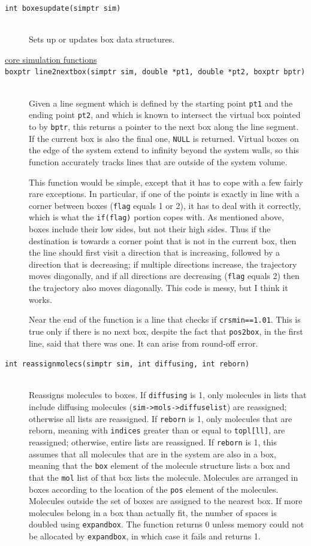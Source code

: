 \documentclass {scrbook}
\newcommand {\ttt} {\texttt}
\begin{document}
\begin{description}
\item[\ttt{int boxesupdate(simptr sim)}]
\hfill \\
Sets up or updates box data structures.

\item[\underline{core simulation functions}]

\item[\ttt{boxptr line2nextbox(simptr sim, double *pt1, double *pt2, boxptr bptr)}]
\hfill \\
Given a line segment which is defined by the starting point \ttt{pt1} and the ending point \ttt{pt2}, and which is known to intersect the virtual box pointed to by \ttt{bptr}, this returns a pointer to the next box along the line segment. If the current box is also the final one, \ttt{NULL} is returned. Virtual boxes on the edge of the system extend to infinity beyond the system walls, so this function accurately tracks lines that are outside of the system volume.

This function would be simple, except that it has to cope with a few fairly rare exceptions. In particular, if one of the points is exactly in line with a corner between boxes (\ttt{flag} equals 1 or 2), it has to deal with it correctly, which is what the \ttt{if(flag)} portion copes with. As mentioned above, boxes include their low sides, but not their high sides. Thus if the destination is towards a corner point that is not in the current box, then the line should first visit a direction that is increasing, followed by a direction that is decreasing; if multiple directions increase, the trajectory moves diagonally, and if all directions are decreasing (\ttt{flag} equals 2) then the trajectory also moves diagonally. This code is messy, but I think it works.

Near the end of the function is a line that checks if \ttt{crsmin==1.01}. This is true only if there is no next box, despite the fact that \ttt{pos2box}, in the first line, said that there was one. It can arise from round-off error.

\item[\ttt{int reassignmolecs(simptr sim, int diffusing, int reborn)}]
\hfill \\
Reassigns molecules to boxes. If \ttt{diffusing} is 1, only molecules in lists that include diffusing molecules (\ttt{sim->mols->diffuselist}) are reassigned; otherwise all lists are reassigned. If \ttt{reborn} is 1, only molecules that are reborn, meaning with \ttt{indices} greater than or equal to \ttt{topl[ll]}, are reassigned; otherwise, entire lists are reassigned. If \ttt{reborn} is 1, this assumes that all molecules that are in the system are also in a box, meaning that the \ttt{box} element of the molecule structure lists a box and that the \ttt{mol} list of that box lists the molecule. Molecules are arranged in boxes according to the location of the \ttt{pos} element of the molecules. Molecules outside the set of boxes are assigned to the nearest box. If more molecules belong in a box than actually fit, the number of spaces is doubled using \ttt{expandbox}. The function returns 0 unless memory could not be allocated by \ttt{expandbox}, in which case it fails and returns 1.


\end{description}
\end{document}

